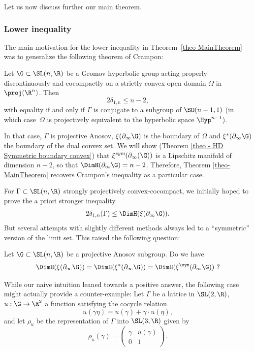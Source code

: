 Let us now discuss further our main theorem.

\subsubsection*{Lower inequality}

The main motivation for the lower inequality in Theorem~\ref{theo-MainTheorem} was to generalize the following theorem of Crampon:

\begin{theo}
Let $\G \subset \SL(n,\R)$ be a Gromov hyperbolic group acting properly discontinuously and cocompactly on a strictly convex open domain $\Omega$ in $\proj(\R^n)$. Then
\[2\delta_{1,n} \leq n-2,\]
with equality if and only if $\Gamma$ is conjugate to a subgroup of $\SO(n-1,1)$ (in which case~$\Omega$ is projectively equivalent to the hyperbolic space $\Hyp^{n-1}$).
\end{theo}

In that case, $\Gamma$ is projective Anosov, $\xi(\partial_\infty \G)$ is the boundary of $\Omega$ and $\xi^*(\partial_\infty \G)$ the boundary of the dual convex set. We will show (Theorem \ref{theo - HD Symmetric boundary convex}) that $\xi^{\textit{sym}}(\partial_\infty(\G))$ is a Lipschitz manifold of dimension $n-2$, so that $\DimH(\partial_\infty \G) = n-2$. Therefore, Theorem \ref{theo-MainTheorem} recovers Crampon's inequality as a particular case.

For $\Gamma\subset \SL(n,\R)$ strongly projectively convex-cocompact, we initially hoped to prove the a priori stronger inequality
\[2 \delta_{1,n}(\Gamma) \leq \DimH(\xi(\partial_\infty \G)).\] But several attempts with slightly different methods always led to a ``symmetric'' version of the limit set. This raised the following question:
\begin{question} \label{ques-HaudorffDimensionSymmetric}
Let $\G \subset \SL(n,\R)$ be a projective Anosov subgroup. Do we have
\[\DimH(\xi(\partial_\infty \G)) = \DimH(\xi^*(\partial_\infty \G)) = \DimH(\xi^{\sym}(\partial_\infty \G))~?\]
\end{question}
While our naive intuition leaned towards a positive answer, the following case might actually provide a counter-example: Let $\Gamma$ be a lattice in $\SL(2,\R)$, $u:\G \to \R^2$ a function satisfying the cocycle relation
\[u(\gamma \eta) = u(\gamma) + \gamma \cdot u(\eta),\]
and let $\rho_u$ be the representation of $\Gamma$ into $\SL(3,\R)$ given by
\[\rho_u(\gamma) = \left( \begin{matrix} \gamma & u(\gamma) \\ 0 & 1\end{matrix} \right).\]

